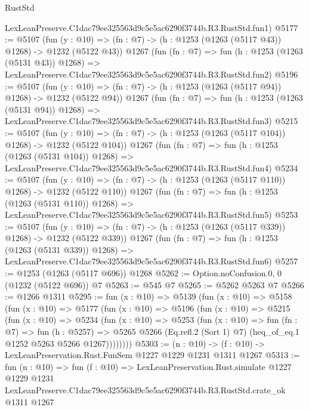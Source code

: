 \begin{lexlean}{RustStd}
\begin{coremodule}
    LexLeanPreserve.C1dac79ee325563d9c5e5ac6290f3744b.R3.RustStd.fun1)
@5177 := @5107
    (fun (y : @10) => (fn : @7) -> (h : @1253 (@1263 (@5117 @43)) @1268) -> @1232 (@5122 @43))
    @1267
    (fun (fn : @7) =>
    fun (h : @1253 (@1263 (@5131 @43)) @1268) =>
    LexLeanPreserve.C1dac79ee325563d9c5e5ac6290f3744b.R3.RustStd.fun2)
@5196 := @5107
    (fun (y : @10) => (fn : @7) -> (h : @1253 (@1263 (@5117 @94)) @1268) -> @1232 (@5122 @94))
    @1267
    (fun (fn : @7) =>
    fun (h : @1253 (@1263 (@5131 @94)) @1268) =>
    LexLeanPreserve.C1dac79ee325563d9c5e5ac6290f3744b.R3.RustStd.fun3)
@5215 := @5107
    (fun (y : @10) => (fn : @7) -> (h : @1253 (@1263 (@5117 @104)) @1268) -> @1232 (@5122 @104))
    @1267
    (fun (fn : @7) =>
    fun (h : @1253 (@1263 (@5131 @104)) @1268) =>
    LexLeanPreserve.C1dac79ee325563d9c5e5ac6290f3744b.R3.RustStd.fun4)
@5234 := @5107
    (fun (y : @10) => (fn : @7) -> (h : @1253 (@1263 (@5117 @110)) @1268) -> @1232 (@5122 @110))
    @1267
    (fun (fn : @7) =>
    fun (h : @1253 (@1263 (@5131 @110)) @1268) =>
    LexLeanPreserve.C1dac79ee325563d9c5e5ac6290f3744b.R3.RustStd.fun5)
@5253 := @5107
    (fun (y : @10) => (fn : @7) -> (h : @1253 (@1263 (@5117 @339)) @1268) -> @1232 (@5122 @339))
    @1267
    (fun (fn : @7) =>
    fun (h : @1253 (@1263 (@5131 @339)) @1268) =>
    LexLeanPreserve.C1dac79ee325563d9c5e5ac6290f3744b.R3.RustStd.fun6)
@5257 := @1253 (@1263 (@5117 @696)) @1268
@5262 := Option.noConfusion.{0, 0} (@1232 (@5122 @696)) @7
@5263 := @545 @7
@5265 := @5262 @5263 @7
@5266 := @1266 @1311
@5295 := fun (x : @10) =>
  @5139
    (fun (x : @10) =>
    @5158
      (fun (x : @10) =>
      @5177
        (fun (x : @10) =>
        @5196
          (fun (x : @10) =>
          @5215
            (fun (x : @10) =>
            @5234
              (fun (x : @10) =>
              @5253
                (fun (x : @10) =>
                fun (fn : @7) =>
                fun (h : @5257) =>
                @5265 @5266 (Eq.refl.{2} (Sort 1) @7) (heq_of_eq.{1} @1252 @5263 @5266 @1267))))))))
@5303 := (n : @10) -> (f : @10) -> LexLeanPreservation.Rust.FunSem @1227 @1229 @1231 @1311 @1267
@5313 := fun (n : @10) =>
  fun (f : @10) =>
  LexLeanPreservation.Rust.simulate
    @1227
    @1229
    @1231
    LexLeanPreserve.C1dac79ee325563d9c5e5ac6290f3744b.R3.RustStd.crate_ok
    @1311
    @1267
\end{coremodule}
\end{lexlean}
